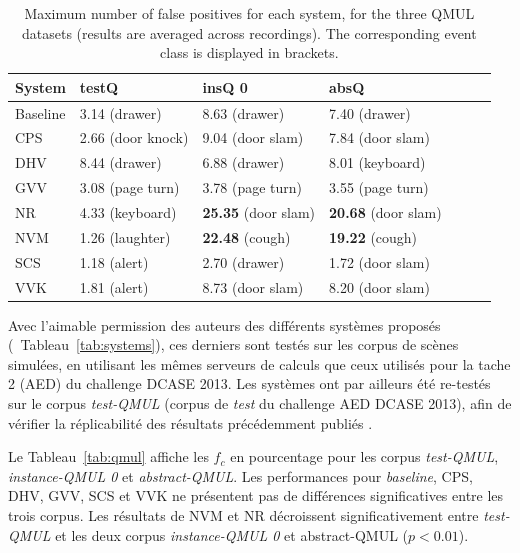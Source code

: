 \begin{table}
\begin{center} 
\begin{tabular}{lllllll}  
   System &   testQ            &  insQ 0                                  &   absQ          \\
 \hline
 Baseline & 3.14 \hfill (drawer)     &  8.63 \hfill (drawer)              &  7.40 \hfill  (drawer) \\
      CPS & 2.66 \hfill (door knock) &  9.04 \hfill (door slam)           &  7.84 \hfill (door slam) \\
      DHV & 8.44 \hfill (drawer)     &  6.88 \hfill (drawer)              &  8.01 \hfill (keyboard) \\
      GVV & 3.08 \hfill (page turn)  &  3.78 \hfill (page turn)           &  3.55 \hfill (page turn) \\
      NR  & 4.33 \hfill (keyboard)   & \textbf{25.35} \hfill (door slam)  & \textbf{20.68 } \hfill (door slam) \\
      NVM & 1.26 \hfill (laughter)   & \textbf{22.48} \hfill (cough)      & \textbf{19.22}  \hfill (cough) \\
      SCS & 1.18 \hfill (alert)      &  2.70 \hfill (drawer)              &  1.72 \hfill (door slam) \\
      VVK & 1.81 \hfill (alert)      &  8.73 \hfill (door slam)           &  8.20 \hfill (door slam) \\ 
       \hline
\end{tabular}
\end{center} 
\caption{Maximum number of false positives for each system, for the three QMUL datasets (results are averaged across recordings). The corresponding event class is displayed in brackets.}
\label{tab:fp}
\end{table}

Avec l'aimable permission des auteurs des différents systèmes proposés (\cf~Tableau~\ref{tab:systems}), ces derniers sont testés sur les corpus de scènes simulées, en utilisant les mêmes serveurs de calculs que ceux utilisés pour la tache 2 (AED) du challenge DCASE 2013. Les systèmes ont par ailleurs été re-testés sur le corpus \emph{test-QMUL} (corpus de \emph{test} du challenge AED DCASE 2013), afin de vérifier la réplicabilité des résultats précédemment publiés \citep{Stowell15}.

Le Tableau~\ref{tab:qmul} affiche les $f_c$ en pourcentage pour les corpus \emph{test-QMUL}, \emph{instance-QMUL 0} et \emph{abstract-QMUL}. Les performances pour \emph{baseline}, CPS, DHV, GVV, SCS et VVK ne présentent pas de différences significatives entre les trois corpus. Les résultats de NVM et NR décroissent significativement entre \emph{test-QMUL} et les deux corpus \emph{instance-QMUL 0} et abstract-QMUL ($p<0.01$).

